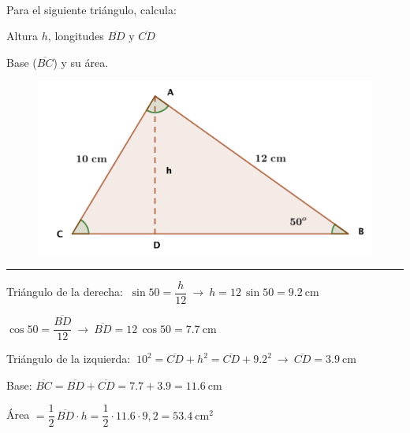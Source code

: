 \vspace{5mm}
\begin{miejercicio}

\begin{multicols}{2}
$\quad$

Para el siguiente triángulo, calcula:

\vspace{6mm} Altura $h$, longitudes $\overline{BD} \text{ y } \overline{CD}$

\vspace{3mm} Base ($\overline{BC}$) y su área.
\begin{figure}[H]
	\centering
	\includegraphics[width=.5\textwidth]{img-rt/rt32.png}
\end{figure}	
\end{multicols}

\vspace{-10mm}%
\rule{250pt}{0.1pt}	

\vspace{3mm} Triángulo de la derecha: $\ \sin 50=\dfrac h{12} \ \to \ h=12\, \sin 50=9.2 \ \mathrm{cm}$

\vspace{1mm} $\cos 50=\dfrac{\overline{BD}}{12} \ \to \ \overline{BD}=12\, \cos 50=7.7 \ \mathrm{cm}$

\vspace{5mm} Triángulo de la izquierda: $\ 10^2=\overline{CD}+h^2=\overline{CD}+9.2^2 \ \to \ \overline{CD}=3.9 \ \mathrm{cm}$

\vspace{1mm} Base: $\overline{BC}=	\overline{BD}+\overline{CD}=7.7+3.9=11.6 \ \mathrm{cm}$

\vspace{1mm} Área $=\dfrac 1 2 \, \overline{BD}\cdot h=\dfrac 1 2 \cdot 11.6 \cdot 9,2 = 53.4 \ \mathrm{cm}^2$
\end{miejercicio}



